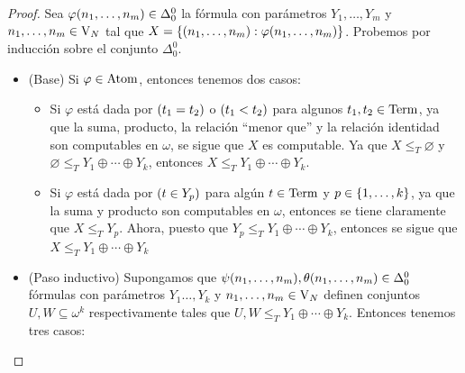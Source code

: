 \begin{proof}
	Sea $\varphi\pa*{n_{1},\dotsc, n_{m}}\in\Delta_{0}^{0}$ la fórmula con parámetros $Y_{1},\dotsc, Y_{m}$ y $n_{1},\dotsc, n_{m}\in\VARIABLES[N]$ tal que $X =\set*{\pa*{n_{1},\dotsc, n_{m}}:\varphi\pa*{n_{1},\dotsc, n_{m}}}$. Probemos por inducción sobre el conjunto $\Delta_{0}^{0}$.

	\begin{itemize}
		\item (Base) Si $\varphi\in\ATOMICAS$, entonces tenemos dos casos:

		\begin{itemize}
			\item Si $\varphi$ está dada por $\pa*{t_{1} = t_{2}}$ o $\pa*{t_{1} < t_{2}}$ para algunos $t_{1}, t_{2}\in\TERMINOS$, ya que la suma, producto, la relación ``menor que'' y la relación identidad son computables en $\omega$, se sigue que $X$ es computable. Ya que $X\leq_{T}\varnothing$ y $\varnothing\leq_{T} Y_{1}\oplus\dotsb\oplus Y_{k}$, entonces $X\leq_{T} Y_{1}\oplus\dotsb\oplus Y_{k}$.
			\item Si $\varphi$ está dada por $\pa*{t\in Y_{p}}$ para algún $t\in\TERMINOS$ y $p\in\set*{1,\dotsc, k}$, ya que la suma y producto son computables en $\omega$, entonces se tiene claramente que $X\leq_{T} Y_{p}$. Ahora, puesto que $Y_{p}\leq_{T} Y_{1}\oplus\dotsb\oplus Y_{k}$, entonces se sigue que $X\leq_{T} Y_{1}\oplus\dotsb\oplus Y_{k}$
		\end{itemize}

		\item (Paso inductivo) Supongamos que $\psi\pa*{n_{1},\dotsc, n_{m}},\theta\pa*{n_{1},\dotsc, n_{m}}\in\Delta_{0}^{0}$ fórmulas con parámetros $Y_{1}\dotsc, Y_{k}$ y $n_{1},\dotsc, n_{m}\in\VARIABLES[N]$ definen conjuntos $U, W\subseteq\omega^{k}$ respectivamente tales que $U, W\leq_{T} Y_{1}\oplus\dotsb\oplus Y_{k}$. Entonces tenemos tres casos:


\end{itemize}
\end{proof}
